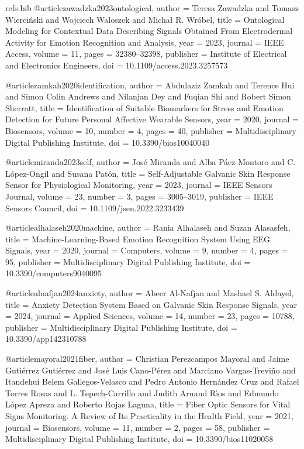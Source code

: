 \begin{filecontents*}[overwrite]{refs.bib}
@article{zawadzka2023ontological,
  author = {Teresa Zawadzka and Tomasz Wierci{\'n}ski and Wojciech Waloszek and Micha{\l} R. Wr{\'o}bel},
  title = {{Ontological Modeling for Contextual Data Describing Signals Obtained From Electrodermal Activity for Emotion Recognition and Analysis}},
  year = {2023},
  journal = {IEEE Access},
  volume = {11},
  pages = {32380--32398},
  publisher = {Institute of Electrical and Electronics Engineers},
  doi = {10.1109/access.2023.3257573}
}

@article{zamkah2020identification,
  author = {Abdulaziz Zamkah and Terence Hui and Simon Colin Andrews and Nilanjan Dey and Fuqian Shi and Robert Simon Sherratt},
  title = {{Identification of Suitable Biomarkers for Stress and Emotion Detection for Future Personal Affective Wearable Sensors}},
  year = {2020},
  journal = {Biosensors},
  volume = {10},
  number = {4},
  pages = {40},
  publisher = {Multidisciplinary Digital Publishing Institute},
  doi = {10.3390/bios10040040}
}

@article{miranda2023self,
  author = {Jos{\'e} Miranda and Alba P{\'a}ez-Montoro and C. L{\'o}pez-Ongil and Susana Pat{\'o}n},
  title = {{Self-Adjustable Galvanic Skin Response Sensor for Physiological Monitoring}},
  year = {2023},
  journal = {IEEE Sensors Journal},
  volume = {23},
  number = {3},
  pages = {3005--3019},
  publisher = {IEEE Sensors Council},
  doi = {10.1109/jsen.2022.3233439}
}

@article{alhalaseh2020machine,
  author = {Rania Alhalaseh and Suzan Alasasfeh},
  title = {{Machine-Learning-Based Emotion Recognition System Using EEG Signals}},
  year = {2020},
  journal = {Computers},
  volume = {9},
  number = {4},
  pages = {95},
  publisher = {Multidisciplinary Digital Publishing Institute},
  doi = {10.3390/computers9040095}
}

@article{alnafjan2024anxiety,
  author = {Abeer Al-Nafjan and Mashael S. Aldayel},
  title = {{Anxiety Detection System Based on Galvanic Skin Response Signals}},
  year = {2024},
  journal = {Applied Sciences},
  volume = {14},
  number = {23},
  pages = {10788},
  publisher = {Multidisciplinary Digital Publishing Institute},
  doi = {10.3390/app142310788}
}

@article{mayoral2021fiber,
  author = {Christian Perezcampos Mayoral and Jaime Guti{\'e}rrez Guti{\'e}rrez and Jos{\'e} Luis Cano-P{\'e}rez and Marciano Vargas-Trevi{\~n}o and Itandehui Belem Gallegos-Velasco and Pedro Antonio Hern{\'a}ndez Cruz and Rafael Torres Rosas and L. Tepech-Carrillo and Judith Arnaud R{\'\i}os and Edmundo L{\'o}pez Apreza and Roberto Rojas Laguna},
  title = {{Fiber Optic Sensors for Vital Signs Monitoring. A Review of Its Practicality in the Health Field}},
  year = {2021},
  journal = {Biosensors},
  volume = {11},
  number = {2},
  pages = {58},
  publisher = {Multidisciplinary Digital Publishing Institute},
  doi = {10.3390/bios11020058}
}


\end{filecontents*}
